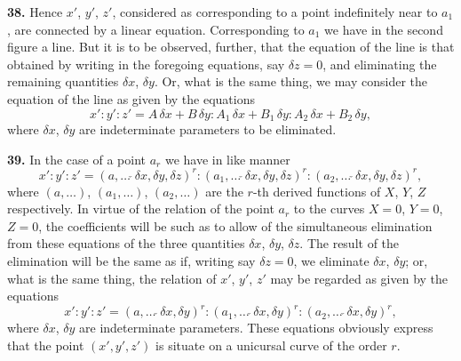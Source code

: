 \documentclass[12pt,a4paper]{article}
\theoremstyle{plain}
\theoremstyle{definition}
\theoremstyle{remark}
\begin{document}
\textbf{38.} Hence $x'$, $y'$, $z'$, considered as corresponding to a point indefinitely near to $a_1$, are connected by a linear equation. Corresponding to $a_1$ we have in the second figure a line. But it is to be observed, further, that the equation of the line is that obtained by writing in the foregoing equations, say $\delta z = 0$, and eliminating the remaining quantities $\delta x$, $\delta y$. Or, what is the same thing, we may consider the equation of the line as given by the equations
\[
x' : y' : z' = A\,\delta x + B\,\delta y : A_1\,\delta x + B_1\,\delta y : A_2\,\delta x + B_2\,\delta y,
\]
where $\delta x$, $\delta y$ are indeterminate parameters to be eliminated.

\textbf{39.} In the case of a point $a_r$ we have in like manner
\[
x' : y' : z' = (a, \ldots \,\check{}\, \delta x, \delta y, \delta z)^r : (a_1, \ldots \,\check{}\, \delta x, \delta y, \delta z)^r : (a_2, \ldots \,\check{}\, \delta x, \delta y, \delta z)^r,
\]
where $(a, \ldots)$, $(a_1, \ldots)$, $(a_2, \ldots)$ are the $r$-th derived functions of $X$, $Y$, $Z$ respectively. In virtue of the relation of the point $a_r$ to the curves $X = 0$, $Y = 0$, $Z = 0$, the coefficients will be such as to allow of the simultaneous elimination from these equations of the three quantities $\delta x$, $\delta y$, $\delta z$. The result of the elimination will be the same as if, writing say $\delta z = 0$, we eliminate $\delta x$, $\delta y$; or, what is the same thing, the relation of $x'$, $y'$, $z'$ may be regarded as given by the equations
\[
x' : y' : z' = (a, \ldots \,\check{}\, \delta x, \delta y)^r : (a_1, \ldots \,\check{}\, \delta x, \delta y)^r : (a_2, \ldots \,\check{}\, \delta x, \delta y)^r,
\]
where $\delta x$, $\delta y$ are indeterminate parameters. These equations obviously express that the point $(x', y', z')$ is situate on a unicursal curve of the order $r$.
\end{document}
